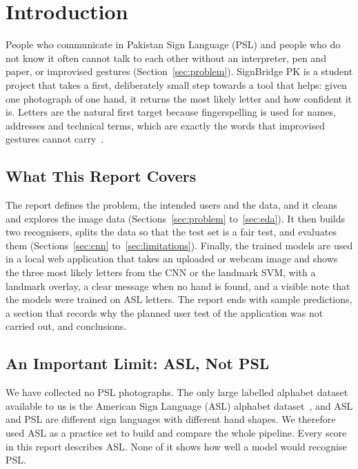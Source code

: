 \section{Introduction}
\label{sec:introduction}

People who communicate in Pakistan Sign Language (PSL) and people who do not know it often cannot talk to each other without an interpreter, pen and paper, or improvised gestures (Section~\ref{sec:problem}). SignBridge PK is a student project that takes a first, deliberately small step towards a tool that helps: given one photograph of one hand, it returns the most likely letter and how confident it is. Letters are the natural first target because fingerspelling is used for names, addresses and technical terms, which are exactly the words that improvised gestures cannot carry~\cite{pslcfrt}.

\subsection{What This Report Covers}

The report defines the problem, the intended users and the data, and it cleans and explores the image data (Sections~\ref{sec:problem} to~\ref{sec:eda}). It then builds two recognisers, splits the data so that the test set is a fair test, and evaluates them (Sections~\ref{sec:cnn} to~\ref{sec:limitations}). Finally, the trained models are used in a local web application that takes an uploaded or webcam image and shows the three most likely letters from the CNN or the landmark SVM, with a landmark overlay, a clear message when no hand is found, and a visible note that the models were trained on ASL letters. The report ends with sample predictions, a section that records why the planned user test of the application was not carried out, and conclusions.

\subsection{An Important Limit: ASL, Not PSL}

We have collected no PSL photographs. The only large labelled alphabet dataset available to us is the American Sign Language (ASL) alphabet dataset~\cite{asl_alphabet_kaggle}, and ASL and PSL are different sign languages with different hand shapes. We therefore used ASL as a practice set to build and compare the whole pipeline. Every score in this report describes ASL. None of it shows how well a model would recognise PSL.

